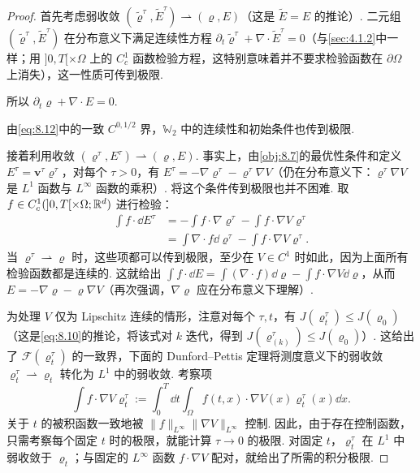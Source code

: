 \begin{proof}
首先考虑弱收敛 $(\widetilde\varrho^\tau,\widetilde E^\tau)\rightharpoonup(\varrho,E)$（这是 $\widetilde E=E$ 的推论）. 二元组 $(\widetilde\varrho^\tau,\widetilde E^\tau)$ 在分布意义下满足连续性方程 $\partial_t\widetilde\varrho^\tau+\nabla\cdot\widetilde E^\tau=0$（与\autoref{sec:4.1.2}中一样；用 $]0,T[\times\Omega$ 上的 $C_c^1$ 函数检验方程，这特别意味着并不要求检验函数在 $\partial\Omega$ 上消失），这一性质可传到极限.

所以 $\partial_t\varrho+\nabla\cdot E=0$.

由\eqref{eq:8.12}中的一致 $C^{0,1/2}$ 界，$\mathbb W_2$ 中的连续性和初始条件也传到极限.

接着利用收敛 $(\varrho^\tau,E^\tau)\rightharpoonup(\varrho,E)$. 事实上，由\autoref{obj:8.7}的最优性条件和定义 $E^\tau=\mathbf v^\tau\varrho^\tau$，对每个 $\tau>0$，有 $E^\tau=-\nabla\varrho^\tau-\varrho^\tau\nabla V$（仍在分布意义下：$\varrho^\tau\nabla V$ 是 $L^1$ 函数与 $L^\infty$ 函数的乘积）. 将这个条件传到极限也并不困难. 取 $f\in C_c^1(]0,T[\times\Omega;\mathbb R^d)$ 进行检验：
\[
\begin{aligned}
\int f\cdot\dd E^\tau
&=-\int f\cdot\nabla\varrho^\tau-\int f\cdot\nabla V\varrho^\tau\\
&=\int\nabla\cdot f\dd\varrho^\tau-\int f\cdot\nabla V\varrho^\tau.
\end{aligned}
\]
当 $\varrho^\tau\rightharpoonup\varrho$ 时，这些项都可以传到极限，至少在 $V\in C^1$ 时如此，因为上面所有检验函数都是连续的. 这就给出 $\int f\cdot\dd E=\int(\nabla\cdot f)\dd\varrho-\int f\cdot\nabla V\dd\varrho$，从而 $E=-\nabla\varrho-\varrho\nabla V$（再次强调，$\nabla\varrho$ 应在分布意义下理解）.

为处理 $V$ 仅为 Lipschitz 连续的情形，注意对每个 $\tau,t$，有 $J(\varrho_t^\tau)\leq J(\varrho_0)$（这是\eqref{eq:8.10}的推论，将该式对 $k$ 迭代，得到 $J(\varrho_{(k)}^\tau)\leq J(\varrho_0)$）. 这给出了 $\mathscr F(\varrho_t^\tau)$ 的一致界，下面的 Dunford--Pettis 定理将测度意义下的弱收敛 $\varrho_t^\tau\rightharpoonup\varrho_t$ 转化为 $L^1$ 中的弱收敛. 考察项
\[
\int f\cdot\nabla V\varrho_t^\tau
:=\int_0^T\dd t\int_\Omega f(t,x)\cdot\nabla V(x)\varrho_t^\tau(x)\dd x.
\]
关于 $t$ 的被积函数一致地被 $\|f\|_{L^\infty}\|\nabla V\|_{L^\infty}$ 控制. 因此，由于存在控制函数，只需考察每个固定 $t$ 时的极限，就能计算 $\tau\to0$ 的极限. 对固定 $t$，$\varrho_t^\tau$ 在 $L^1$ 中弱收敛于 $\varrho_t$；与固定的 $L^\infty$ 函数 $f\cdot\nabla V$ 配对，就给出了所需的积分极限.
\end{proof}

